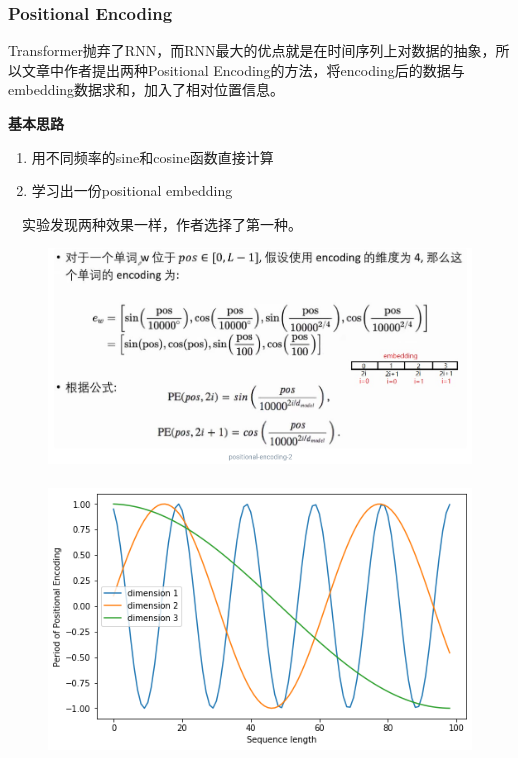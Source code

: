 \documentclass[10pt,t,handout]{beamer}
\begin{document}
\begin{frame}
\frametitle{Positional Encoding}
Transformer抛弃了RNN，而RNN最大的优点就是在时间序列上对数据的抽象，所以文章中作者提出两种Positional Encoding的方法，将encoding后的数据与embedding数据求和，加入了相对位置信息。
\begin{block}{\textbf{基本思路}}
	\begin{enumerate}
		\item<0->  用不同频率的sine和cosine函数直接计算 
		\item<0-> 学习出一份positional embedding
	\end{enumerate}
\
\
实验发现两种效果一样，作者选择了第一种。
\end{block}
	\begin{figure}
	\centering
	\includegraphics[scale=.3]{14.png}	~~~~
	\includegraphics[scale=.2]{15.png}  ~~~~
\end{figure}

\end{frame}
\end{document}
